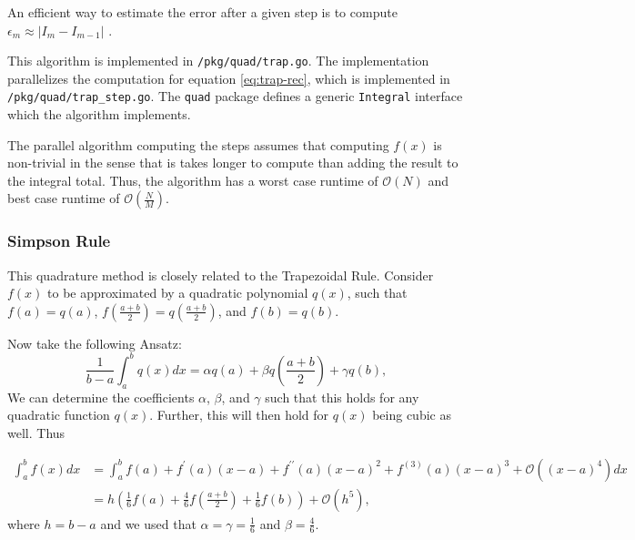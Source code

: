 \documentclass[10pt, a4paper]{article}
\begin{document}
  An efficient way to estimate the error after a given step is to compute $\epsilon_m \approx |I_m - I_{m-1}|$
  \cite{nr}\footnotemark.


  This algorithm is implemented in \texttt{/pkg/quad/trap.go}. The implementation parallelizes the computation
  for equation \ref{eq:trap-rec}, which is implemented in \texttt{/pkg/quad/trap\_step.go}.
  The \texttt{quad} package defines a generic \texttt{Integral} interface which the algorithm implements.

  The parallel algorithm computing the steps assumes that computing $f(x)$ is non-trivial in the sense
  that is takes longer to compute than adding the result to the integral total. Thus, the
  algorithm has a worst case runtime of $\mathcal{O}(N)$ and best case runtime of $\mathcal{O}(\frac NM)$.

  \subsubsection{Simpson Rule}
  This quadrature method is closely related to the Trapezoidal Rule\footnotemark. Consider
  $f(x)$ to be approximated by a quadratic polynomial $q(x)$, such that $f(a) = q(a)$,
  $f(\frac{a+b}{2}) = q(\frac{a+b}{2})$, and $f(b) = q(b)$.


  Now take the following Ansatz:
  \begin{equation}
  \frac{1}{b-a} \int_a^b q(x) dx = \alpha q(a) + \beta q(\frac{a+b}{2}) + \gamma q(b),
  \end{equation}
  We can determine the coefficients $\alpha$, $\beta$, and $\gamma$ such that this holds for any
  quadratic function $q(x)$. Further, this will then hold for $q(x)$ being cubic as well\cite{nr}. Thus

  \begin{equation}
  \begin{split}
  \int_a^b f(x) dx &= \int_a^b f(a) + f^\prime(a) (x-a) + f^{\prime\prime}(a) (x-a)^2 + f^{(3)}(a) (x-a)^3 + \mathcal{O}\left((x-a)^4\right) dx \\
  &= h \left( \frac{1}{6} f(a) + \frac{4}{6} f(\frac{a+b}{2}) + \frac{1}{6} f(b) \right) + \mathcal{O}(h^5),
  \end{split}
  \end{equation}
  where $h = b-a$ and we used that $\alpha = \gamma = \frac{1}{6}$ and $\beta = \frac{4}{6}$.
\end{document}
